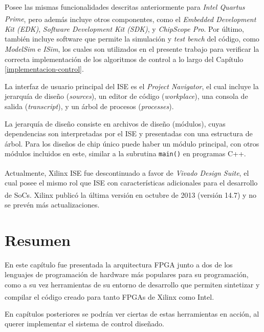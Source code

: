 Posee las mismas funcionalidades descritas anteriormente para \emph{Intel Quartus Prime\textsuperscript\textregistered\hspace{0.05pt}}, pero además incluye otros componentes, como el \emph{Embedded Development Kit (EDK)}, \emph{Software Development Kit (SDK)}, y \emph{ChipScope Pro}. Por último, también incluye software que permite la simulación y \emph{test bench} del código, como \emph{ModelSim} e \emph{ISim}, los cuales son utilizados en el presente trabajo para verificar la correcta implementación de los algoritmos de control a lo largo del Capítulo \ref{implementacion-control}.

La interfaz de usuario principal del ISE es el \emph{Project Navigator}, el cual incluye la jerarquía de diseño (\emph{sources}), un editor de código (\emph{workplace}), una consola de salida (\emph{transcript}), y un árbol de procesos (\emph{processes}).

La jerarquía de diseño consiste en archivos de diseño (módulos), cuyas dependencias son interpretadas por el ISE y presentadas con una estructura de árbol. Para los diseños de chip único puede haber un módulo principal, con otros módulos incluidos en este, similar a la subrutina \texttt{main()} en programas C++.

Actualmente, Xilinx ISE\textsuperscript\textregistered\hspace{0.05pt} fue descontinuado a favor de \emph{Vivado Design Suite}\textsuperscript\textregistered\hspace{0.05pt}, el cual posee el mismo rol que ISE con características adicionales para el desarrollo de SoCs. Xilinx\textsuperscript\textregistered\hspace{0.05pt} publicó la última versión en octubre de 2013 (versión 14.7) y no se prevén más actualizaciones. 


\section{Resumen}

En este capítulo fue presentada la arquitectura FPGA junto a dos de los lenguajes de programación de hardware más populares para su programación, como a su vez herramientas de su entorno de desarrollo que permiten sintetizar y compilar el código creado para tanto FPGAs de Xilinx\textsuperscript\textregistered\hspace{0.05pt} como Intel\textsuperscript\textregistered\hspace{0.05pt}.

En capítulos posteriores se podrán ver ciertas de estas herramientas en acción, al querer implementar el sistema de control diseñado.